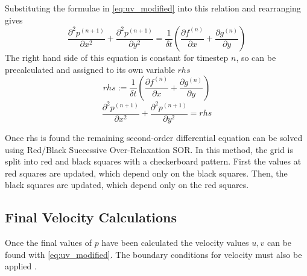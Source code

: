 Substituting the formulae in \autoref{eq:uv_modified} into this relation and rearranging gives
\begin{equation}
    \frac{\partial^2{p^{(n+1)}}}{\partial{x^2}} + \frac{\partial^2{p^{(n+1)}}}{\partial{y^2}} = \frac{1}{\delta{t}}\left(\frac{\partial{f^{(n)}}}{\partial{x}} + \frac{\partial{g^{(n)}}}{\partial{y}}\right)
\end{equation}
The right hand side of this equation is constant for timestep $n$, so can be precalculated and assigned to its own variable $rhs$
\begin{equation}
rhs := \frac{1}{\delta{t}}\left(\frac{\partial{f^{(n)}}}{\partial{x}} + \frac{\partial{g^{(n)}}}{\partial{y}}\right)
\end{equation}
\begin{equation}
\frac{\partial^2{p^{(n+1)}}}{\partial{x^2}} + \frac{\partial^2{p^{(n+1)}}}{\partial{y^2}} = rhs
\end{equation}

Once rhs is found the remaining second-order differential equation can be solved using Red/Black Successive Over-Relaxation SOR.
In this method, the grid is split into red and black squares with a checkerboard pattern.
First the values at red squares are updated, which depend only on the black squares.
Then, the black squares are updated, which depend only on the red squares.

\subsection{Final Velocity Calculations}
Once the final values of $p$ have been calculated the velocity values $u,v$ can be found with \autoref{eq:uv_modified}.
The boundary conditions for velocity must also be applied .


